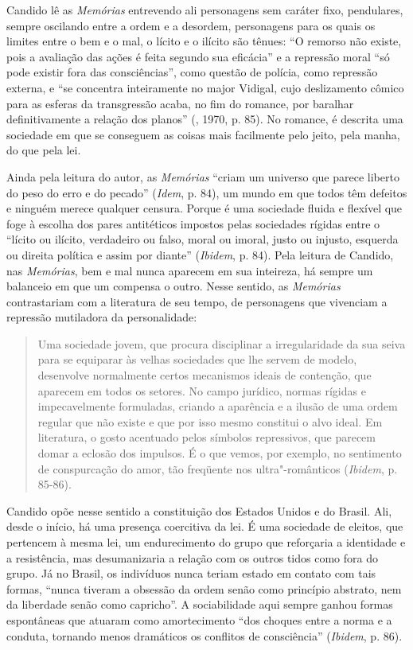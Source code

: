 Candido lê as \emph{Memórias} entrevendo ali personagens sem caráter
fixo, pendulares, sempre oscilando entre a ordem e a desordem,
personagens para os quais os limites entre o bem e o mal, o lícito e o
ilícito são tênues: ``O remorso não existe, pois a avaliação das ações é
feita segundo sua eficácia'' e a repressão moral ``só pode existir fora
das consciências'', como questão de polícia, como repressão externa, e
``se concentra inteiramente no major Vidigal, cujo deslizamento cômico
para as esferas da transgressão acaba, no fim do romance, por baralhar
definitivamente a relação dos planos'' (, 1970, p. 85). No
romance, é descrita uma sociedade em que se conseguem as coisas mais
facilmente pelo jeito, pela manha, do que pela lei.

Ainda pela leitura do autor, as \emph{Memórias} ``criam um universo que
parece liberto do peso do erro e do pecado'' (\emph{Idem}, p. 84), um
mundo em que todos têm defeitos e ninguém merece qualquer censura.
Porque é uma sociedade fluida e flexível que foge à escolha dos pares
antitéticos impostos pelas sociedades rígidas entre o ``lícito ou
ilícito, verdadeiro ou falso, moral ou imoral, justo ou injusto,
esquerda ou direita política e assim por diante'' (\emph{Ibidem}, p.
84). Pela leitura de Candido, nas \emph{Memórias}, bem e mal nunca
aparecem em sua inteireza, há sempre um balanceio em que um compensa o
outro. Nesse sentido, as \emph{Memórias} contrastariam com a literatura
de seu tempo, de personagens que vivenciam a repressão mutiladora da
personalidade:

\begin{quote}
Uma sociedade jovem, que procura disciplinar a irregularidade da sua
seiva para se equiparar às velhas sociedades que lhe servem de modelo,
desenvolve normalmente certos mecanismos ideais de contenção, que
aparecem em todos os setores. No campo jurídico, normas rígidas e
impecavelmente formuladas, criando a aparência e a ilusão de uma ordem
regular que não existe e que por isso mesmo constitui o alvo ideal. Em
literatura, o gosto acentuado pelos símbolos repressivos, que parecem
domar a eclosão dos impulsos. É o que vemos, por exemplo, no sentimento
de conspurcação do amor, tão freqüente nos ultra"-românticos
(\emph{Ibidem}, p. 85-86).
\end{quote}

Candido opõe nesse sentido a constituição dos Estados Unidos e do
Brasil. Ali, desde o início, há uma presença coercitiva da lei. É uma
sociedade de eleitos, que pertencem à mesma lei, um endurecimento do
grupo que reforçaria a identidade e a resistência, mas desumanizaria a
relação com os outros tidos como fora do grupo. Já no Brasil, os
indivíduos nunca teriam estado em contato com tais formas, ``nunca
tiveram a obsessão da ordem senão como princípio abstrato, nem da
liberdade senão como capricho''. A sociabilidade aqui sempre ganhou
formas espontâneas que atuaram como amortecimento ``dos choques entre a
norma e a conduta, tornando menos dramáticos os conflitos de
consciência'' (\emph{Ibidem}, p. 86).

